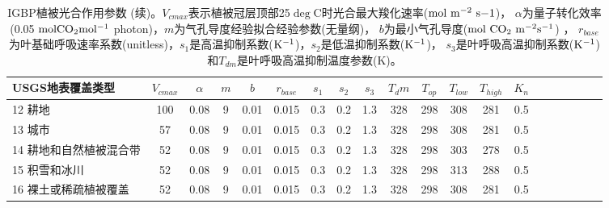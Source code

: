     \begin{sidewaystable}[]
        \centering
        \caption{IGBP植被光合作用参数 (续)。$V_{cmax}$表示植被冠层顶部25$\deg$C时光合最大羧化速率($\rm mol\ m^{-2}\ s{-1}$)，
        $\alpha$为量子转化效率(0.05 $\rm mol CO_2 mol^{-1}$ photon)，$m$为气孔导度经验拟合经验参数(无量纲)，
        $b$为最小气孔导度($\rm mol\ CO_2\ m^{-2}s^{-1}$) ，
        $r_{base}$为叶基础呼吸速率系数(unitless)，$s_1$是高温抑制系数($\rm K^{-1}$)，$s_2$是低温抑制系数($\rm K^{-1}$)，
        $s_3$是叶呼吸高温抑制系数($\rm K^{-1}$)和$T_{dm}$是叶呼吸高温抑制温度参数(K)。}
        \label{tab:IGBP植被光合作用参数2}
        \begin{tabular}{@{}lccccccccccccccccccc@{}}
        \toprule
        USGS地表覆盖类型     &$ V_{cmax}$ & $\alpha$ & $m$& $b$ & $r_{base}$ & $s_1$ & $s_2$ & $s_3$ & $T_dm$ & $T_{op}$ & $T_{low}$ & $T_{high}$ & $K_n$  \\ \midrule
        12 耕地         & 100 & 0.08 & 9 & 0.01 & 0.015 & 0.3 & 0.2 & 1.3 & 328 & 298 & 308 & 281 & 0.5 \\
        13 城市         & 57  & 0.08 & 9 & 0.01 & 0.015 & 0.3 & 0.2 & 1.3 & 328 & 298 & 308 & 281 & 0.5 \\
        14 耕地和自然植被混合带 & 52  & 0.08 & 9 & 0.01 & 0.015 & 0.3 & 0.2 & 1.3 & 328 & 298 & 303 & 278 & 0.5 \\
        15 积雪和冰川      & 52  & 0.08 & 9 & 0.01 & 0.015 & 0.3 & 0.2 & 1.3 & 328 & 298 & 313 & 288 & 0.5 \\
        16 裸土或稀疏植被覆盖  & 52  & 0.08 & 9 & 0.01 & 0.015 & 0.3 & 0.2 & 1.3 & 328 & 298 & 308 & 281 & 0.5 \\\bottomrule
        \end{tabular}
    \end{sidewaystable}
    
